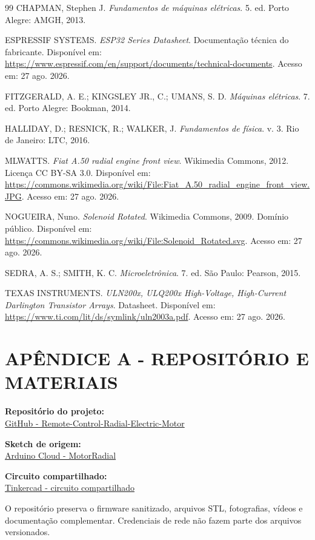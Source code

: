\documentclass[12pt,a4paper,oneside]{article}
\begin{document}
\clearpage
{}
\begin{thebibliography}{99}
 CHAPMAN, Stephen J. \textit{Fundamentos de máquinas elétricas}. 5. ed. Porto Alegre: AMGH, 2013.

 ESPRESSIF SYSTEMS. \textit{ESP32 Series Datasheet}. Documentação técnica do fabricante. Disponível em: \url{https://www.espressif.com/en/support/documents/technical-documents}. Acesso em: 27 ago. 2026.

 FITZGERALD, A. E.; KINGSLEY JR., C.; UMANS, S. D. \textit{Máquinas elétricas}. 7. ed. Porto Alegre: Bookman, 2014.

 HALLIDAY, D.; RESNICK, R.; WALKER, J. \textit{Fundamentos de física}. v. 3. Rio de Janeiro: LTC, 2016.

 MLWATTS. \textit{Fiat A.50 radial engine front view}. Wikimedia Commons, 2012. Licença CC BY-SA 3.0. Disponível em: \url{https://commons.wikimedia.org/wiki/File:Fiat_A.50_radial_engine_front_view.JPG}. Acesso em: 27 ago. 2026.

 NOGUEIRA, Nuno. \textit{Solenoid Rotated}. Wikimedia Commons, 2009. Domínio público. Disponível em: \url{https://commons.wikimedia.org/wiki/File:Solenoid_Rotated.svg}. Acesso em: 27 ago. 2026.

 SEDRA, A. S.; SMITH, K. C. \textit{Microeletrônica}. 7. ed. São Paulo: Pearson, 2015.

 TEXAS INSTRUMENTS. \textit{ULN200x, ULQ200x High-Voltage, High-Current Darlington Transistor Arrays}. Datasheet. Disponível em: \url{https://www.ti.com/lit/ds/symlink/uln2003a.pdf}. Acesso em: 27 ago. 2026.
\end{thebibliography}

\clearpage
\section*{APÊNDICE A - REPOSITÓRIO E MATERIAIS}

\noindent\textbf{Repositório do projeto:}\\
\href{https://github.com/artartoliveira2006-boop/Remote-Control-Radial-Electric-Motor}{GitHub - Remote-Control-Radial-Electric-Motor}

\noindent\textbf{Sketch de origem:}\\
\href{https://app.arduino.cc/sketches/5fc2e5a7-c3c3-415b-b562-e2339e4dc90b?view-mode=preview}{Arduino Cloud - MotorRadial}

\noindent\textbf{Circuito compartilhado:}\\
\href{https://www.tinkercad.com/things/hriccYSg3r2-dazzling-gaaris-fulffy}{Tinkercad - circuito compartilhado}

O repositório preserva o firmware sanitizado, arquivos STL, fotografias, vídeos e documentação complementar. Credenciais de rede não fazem parte dos arquivos versionados.
\end{document}

